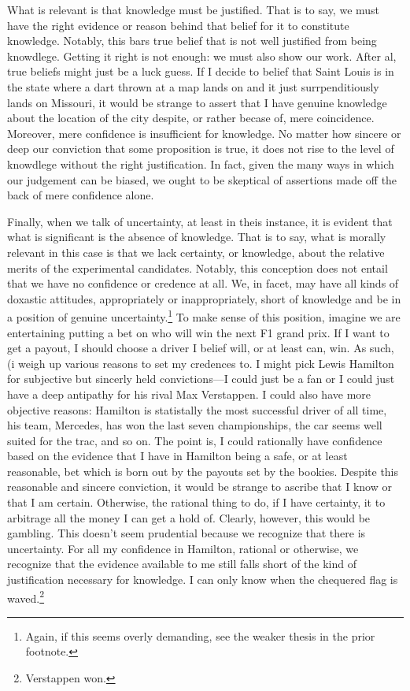 \documentclass[letterpaper,notitlepage,12pt]{article}
\begin{document}
What is relevant is that knowledge must be justified.
That is to say, we must have the right evidence or reason behind that belief for
it to constitute knowledge.
Notably, this bars true belief that is not well justified from being knowdlege.
Getting it right is not enough: we must also show our work.
After al, true beliefs might just be a luck guess.
If I decide to belief that Saint Louis is in the state where a dart thrown at a
map lands on and it just surrpenditiously lands on Missouri, it would be strange
to assert that I have genuine knowledge about the location of the city despite,
or rather becase of, mere coincidence.
Moreover, mere confidence is insufficient for knowledge.
No matter how sincere or deep our conviction that some proposition is true, it
does not rise to the level of knowdlege without the right justification.
In fact, given the many ways in which our judgement can be biased, we ought to
be skeptical of assertions made off the back of mere confidence alone.

Finally, when we talk of uncertainty, at least in theis instance, it is evident
that what is significant is the absence of knowledge.
That is to say, what is morally relevant in this case is that we lack certainty,
or knowledge, about the relative merits of the experimental candidates.
Notably, this conception does not entail that we have no confidence or credence
at all.
We, in facet, may have all kinds of doxastic attitudes, appropriately or
inappropriately, short of knowledge and be in a position of genuine
uncertainty.\footnote{Again, if this seems overly demanding, see the weaker
thesis in the prior footnote.}
To make sense of this position, imagine we are entertaining putting a bet on who
will win the next F1 grand prix.
If I want to get a payout, I should choose a driver I belief will, or at least
can, win.
As such, (i weigh up various reasons to set my credences to.
I might pick Lewis Hamilton for subjective but sincerly held convictions---I
could just be a fan or I could just have a deep antipathy for his rival Max
Verstappen.
I could also have more objective reasons: Hamilton is statistally the most
successful driver of all time, his team, Mercedes, has won the last seven
championships, the car seems well suited for the trac, and so on.
The point is, I could rationally have confidence based on the evidence that I
have in Hamilton being a safe, or at least reasonable, bet which is born out by
the payouts set by the bookies.
Despite this reasonable and sincere conviction, it would be strange to ascribe
that I know or that I am certain. 
Otherwise, the rational thing to do, if I have certainty, it to arbitrage all
the money I can get a hold of.
Clearly, however, this would be gambling.
This doesn't seem prudential because we recognize that there is uncertainty.
For all my confidence in Hamilton, rational or otherwise, we recognize that the
evidence available to me still falls short of the kind of justification
necessary for knowledge.
I can only know when the chequered flag is waved.\footnote{Verstappen won.}
\end{document}
